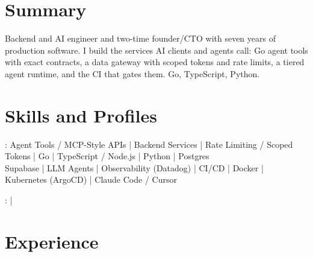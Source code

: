 \documentclass[print]{jack-resume}
\begin{document}
\pagecolor{darkmodeBackground}


\begin{minipage}[t][1cm][t]{.03\textwidth}
    \hfill
\end{minipage}

\section{Summary}
Backend and AI engineer and two-time founder/CTO with seven years of production software. I build the services AI clients and agents call: Go agent tools with exact contracts, a data gateway with scoped tokens and rate limits, a tiered agent runtime, and the CI that gates them. Go, TypeScript, Python.
\sectionsep

\section{Skills and Profiles}
:
Agent Tools / MCP-Style APIs \hfill | \hfill
Backend Services \hfill | \hfill
Rate Limiting / Scoped Tokens \hfill | \hfill
Go \hfill | \hfill
TypeScript / Node.js \hfill | \hfill
Python \hfill | \hfill
Postgres \\
\hspace{1.0cm} Supabase \hfill | \hfill
LLM Agents \hfill | \hfill
Observability (Datadog) \hfill | \hfill
CI/CD \hfill | \hfill
Docker \hfill | \hfill
Kubernetes (ArgoCD) \hfill | \hfill
Claude Code / Cursor \\

\raggedright{
    :
      \href{https://www.linkedin.com/in/jack-sturtevant/}{ \ExternalLink} |
     \href{https://github.com/jacksturt}{ \ExternalLink}}

\section{Experience}
\end{document}
